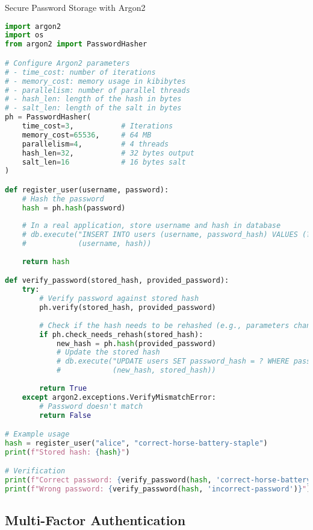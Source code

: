 \begin{examplecode}{Secure Password Storage with Argon2}\\
\begin{lstlisting}[language=Python, style=basesmol]
import argon2
import os
from argon2 import PasswordHasher

# Configure Argon2 parameters
# - time_cost: number of iterations
# - memory_cost: memory usage in kibibytes
# - parallelism: number of parallel threads
# - hash_len: length of the hash in bytes
# - salt_len: length of the salt in bytes
ph = PasswordHasher(
    time_cost=3,           # Iterations
    memory_cost=65536,     # 64 MB
    parallelism=4,         # 4 threads
    hash_len=32,           # 32 bytes output
    salt_len=16            # 16 bytes salt
)

def register_user(username, password):
    # Hash the password
    hash = ph.hash(password)
    
    # In a real application, store username and hash in database
    # db.execute("INSERT INTO users (username, password_hash) VALUES (?, ?)", 
    #            (username, hash))
    
    return hash

def verify_password(stored_hash, provided_password):
    try:
        # Verify password against stored hash
        ph.verify(stored_hash, provided_password)
        
        # Check if the hash needs to be rehashed (e.g., parameters changed)
        if ph.check_needs_rehash(stored_hash):
            new_hash = ph.hash(provided_password)
            # Update the stored hash
            # db.execute("UPDATE users SET password_hash = ? WHERE password_hash = ?", 
            #            (new_hash, stored_hash))
        
        return True
    except argon2.exceptions.VerifyMismatchError:
        # Password doesn't match
        return False

# Example usage
hash = register_user("alice", "correct-horse-battery-staple")
print(f"Stored hash: {hash}")

# Verification
print(f"Correct password: {verify_password(hash, 'correct-horse-battery-staple')}")
print(f"Wrong password: {verify_password(hash, 'incorrect-password')}")
\end{lstlisting}
\end{examplecode}

\subsection{Multi-Factor Authentication}

